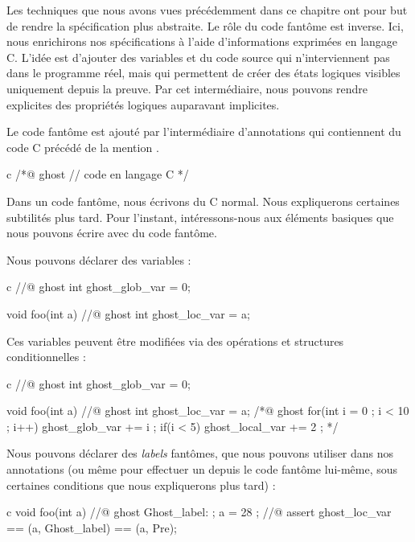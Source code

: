 Les techniques que nous avons vues précédemment dans ce chapitre ont pour but de
rendre la spécification plus abstraite. Le rôle du code fantôme est inverse. Ici,
nous enrichirons nos spécifications à l'aide d'informations exprimées
en langage C. L'idée est d'ajouter des variables et du code source qui
n'interviennent pas dans le programme réel, mais qui permettent de créer des états
logiques visibles uniquement depuis la preuve. Par cet intermédiaire,
nous pouvons rendre explicites des propriétés logiques auparavant
implicites.




Le code fantôme est ajouté par l'intermédiaire d'annotations qui contiennent
du code C précédé de la mention .



\begin{CodeBlock}{c}
/*@
  ghost
  // code en langage C
*/
\end{CodeBlock}


Dans un code fantôme, nous écrivons du C normal. Nous expliquerons certaines
subtilités plus tard. Pour l'instant, intéressons-nous aux éléments
basiques que nous pouvons écrire avec du code fantôme.


Nous pouvons déclarer des variables :


\begin{CodeBlock}{c}
//@ ghost int ghost_glob_var = 0;

void foo(int a){
  //@ ghost int ghost_loc_var = a;
}
\end{CodeBlock}


Ces variables peuvent être modifiées via des opérations et structures
conditionnelles :


\begin{CodeBlock}{c}
//@ ghost int ghost_glob_var = 0;

void foo(int a){
  //@ ghost int ghost_loc_var = a;
  /*@ ghost
    for(int i = 0 ; i < 10 ; i++){
      ghost_glob_var += i ;
      if(i < 5) ghost_local_var += 2 ;
    }
  */
}
\end{CodeBlock}


Nous pouvons déclarer des \textit{labels} fantômes, que nous pouvons utiliser dans
nos annotations (ou même pour effectuer un  depuis le code
fantôme lui-même, sous certaines conditions que nous expliquerons plus tard) :


\begin{CodeBlock}{c}
void foo(int a){
  //@ ghost Ghost_label: ;
  a = 28 ;
  //@ assert ghost_loc_var == \at(a, Ghost_label) == \at(a, Pre);
}
\end{CodeBlock}


